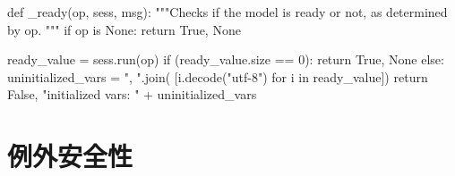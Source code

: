 \begin{content}
\begin{leftbar}
\begin{python}
def _ready(op, sess, msg):
  """Checks if the model is ready or not, as determined by op.
  """
  if op is None:
    return True, None

  ready_value = sess.run(op)
  if (ready_value.size == 0):
    return True, None
  else:
    uninitialized_vars = ", ".join(
        [i.decode("utf-8") for i in ready_value])
    return False, "initialized vars: " + uninitialized_vars
\end{python}
\end{leftbar}

\end{content}

\section{例外安全性}

